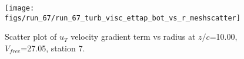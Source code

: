 \begin{figure}[H]
\centering
\texttt{[image: figs/run\_67/run\_67\_turb\_visc\_ettap\_bot\_vs\_r\_meshscatter]}
\caption{Scatter plot of $
u_T$ velocity gradient term vs radius at $z/c$=10.00, $V_{free}$=27.05, station 7.}
\end{figure}


